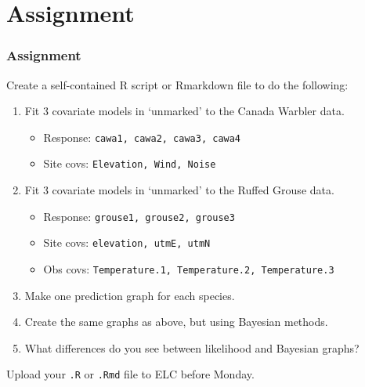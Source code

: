 \documentclass[color=usenames,dvipsnames]{beamer}\usepackage[]{graphicx}\usepackage[]{color}
\begin{document}
\section{Assignment}




\begin{frame}
  \frametitle{Assignment}
  \footnotesize
  Create a self-contained R script or Rmarkdown file
  to do the following:
  \vfill
  \begin{enumerate}
    \footnotesize
    \item Fit 3 covariate models in `unmarked' to the Canada Warbler data. 
      \begin{itemize}
        \footnotesize
        \item Response: \texttt{cawa1, cawa2, cawa3, cawa4}
        \item Site covs: \texttt{Elevation, Wind, Noise}
      \end{itemize}
    \item Fit 3 covariate models in `unmarked' to the Ruffed Grouse data. 
      \begin{itemize}
        \footnotesize
        \item Response: \texttt{grouse1, grouse2, grouse3}
        \item Site covs: \texttt{elevation, utmE, utmN}
        \item Obs covs: \texttt{Temperature.1, Temperature.2, Temperature.3}
      \end{itemize}
    \item Make one prediction graph for each species. 
    \item Create the same graphs as above, but using Bayesian methods.
    \item What differences do you see between likelihood and Bayesian graphs?
    \end{enumerate}
    \vfill
    Upload your {\tt .R} or {\tt .Rmd} file to ELC before Monday. 
\end{frame}
\end{document}

